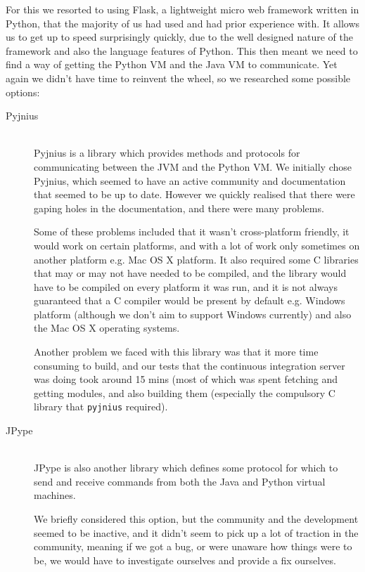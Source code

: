 \documentclass[11pt, a4paper]{article}
\begin{document}
For this we resorted to using Flask, a lightweight micro web framework written
in Python, that the majority of us had used and had prior experience with.  It
allows us to get up to speed surprisingly quickly, due to the well designed
nature of the framework and also the language features of Python.  This then
meant we need to find a way of getting the Python VM and the Java VM to
communicate.  Yet again we didn't have time to reinvent the wheel, so we
researched some possible options:
\begin{description}
  \item[Pyjnius]\hfill\\
    Pyjnius is a library which provides methods and protocols for communicating
    between the JVM and the Python VM.  We initially chose Pyjnius, which seemed
    to have an active community and documentation that seemed to be up to
    date. However we quickly realised that there were gaping holes in the
    documentation, and there were many problems.

    Some of these problems included that it wasn't cross-platform friendly, it
    would work on certain platforms, and with a lot of work only sometimes on
    another platform e.g. Mac OS X platform. It also required some C libraries
    that may or may not have needed to be compiled, and the library would have
    to be compiled on every platform it was run, and it is not always guaranteed
    that a C compiler would be present by default e.g. Windows platform
    (although we don't aim to support Windows currently) and also the Mac OS X
    operating systems.

    Another problem we faced with this library was that it more time consuming
    to build, and our tests that the continuous integration server was doing
    took around 15 mins (most of which was spent fetching and getting modules,
    and also building them (especially the compulsory C library that
    \texttt{pyjnius} required).
  \item[JPype]\hfill\\
    JPype is also another library which defines some protocol for which to send
    and receive commands from both the Java and Python virtual machines.

    We briefly considered this option, but the community and the development
    seemed to be inactive, and it didn't seem to pick up a lot of traction in
    the community, meaning if we got a bug, or were unaware how things were to
    be, we would have to investigate ourselves and provide a fix ourselves.


\end{description}
\end{document}
